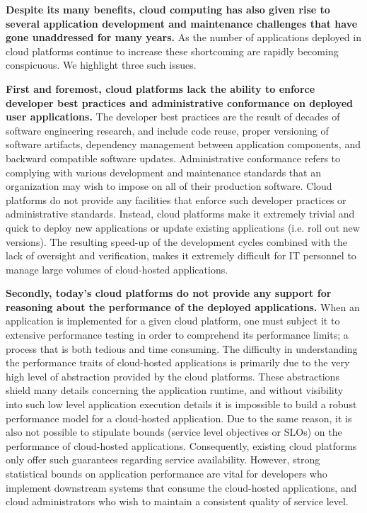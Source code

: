 \textbf{Despite its many benefits, cloud computing has also given rise to several application
development and maintenance challenges that have gone unaddressed for many years.}
As the number of applications deployed in cloud platforms continue to increase these
shortcoming are rapidly becoming conspicuous. We highlight three such issues.
 
\textbf{First and foremost, cloud platforms lack the ability to enforce developer best practices
and administrative conformance on deployed user applications.} The developer best practices 
are the result of decades of software engineering research, and
include code reuse, proper versioning of software artifacts, dependency management
between application components, and backward compatible software updates. Administrative
conformance refers to complying with various development and maintenance standards
that an organization may wish to impose on all of their production software.
Cloud platforms do not provide any facilities that enforce such developer practices or
administrative standards. Instead, cloud platforms
make it extremely trivial and quick to deploy new applications or update existing
applications (i.e. roll out new versions). The resulting speed-up of the development cycles combined with the lack of 
oversight and verification, makes it extremely difficult for 
IT personnel to manage large volumes of cloud-hosted applications.

\textbf{Secondly, today's cloud platforms do not provide any support for reasoning about the 
performance of the deployed applications.} When an application is implemented for
a given cloud platform, one must subject it to extensive performance testing in order
to comprehend its performance limits; a process that is both 
tedious and time consuming. The difficulty in understanding the performance 
traits of cloud-hosted applications is primarily due to the very high level of 
abstraction provided by the cloud platforms. These abstractions shield many details 
concerning the application runtime, and without visibility into such low level application 
execution details it is impossible
to build a robust performance model for a cloud-hosted application. Due to the same
reason, it is also not possible to stipulate bounds (service level objectives or SLOs) on
the performance of cloud-hosted applications. 
Consequently, existing cloud platforms only offer such guarantees regarding service availability.
However, strong statistical bounds on application performance are vital for developers 
who implement downstream systems that consume the cloud-hosted applications,
and cloud administrators who wish to maintain a consistent quality of service
level.

